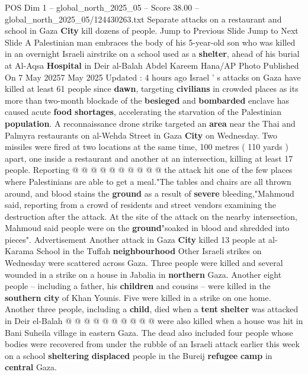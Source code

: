 \begin{textsample}{POS Dim 1 – global\_north\_2025\_05 – Score 38.00 – global\_north\_2025\_05/124430263.txt}  \label{ex:f1_pos_213}
Separate attacks on a restaurant and school in Gaza \textbf{City} kill dozens of people.
Jump to Previous Slide Jump to Next Slide A Palestinian man embraces the body of his 5-year-old son who was killed in an overnight Israeli airstrike on a school used as a \textbf{shelter}, ahead of his burial at Al-Aqsa \textbf{Hospital} in Deir al-Balah Abdel Kareem Hana/AP Photo Published On 7 May 20257 May 2025 Updated : 4 hours ago Israel ' s attacks on Gaza have killed at least 61 people since \textbf{dawn}, targeting \textbf{civilians} in crowded places as its more than two-month blockade of the \textbf{besieged} and \textbf{bombarded} enclave has caused acute \textbf{food} \textbf{shortages}, accelerating the starvation of the Palestinian \textbf{population}.
A reconnaissance drone strike targeted an \textbf{area} near the Thai and Palmyra restaurants on al-Wehda Street in Gaza \textbf{City} on Wednesday.
Two missiles were fired at two locations at the same time, 100 metres ( 110 yards ) apart, one inside a restaurant and another at an intersection, killing at least 17 people.
Reporting @ @ @ @ @ @ @ @ @ @ the attack hit one of the few places where Palestinians are able to get a meal."The tables and chairs are all thrown around, and blood stains the \textbf{ground} as a result of \textbf{severe} bleeding,"Mahmoud said, reporting from a crowd of residents and street vendors examining the destruction after the attack.
At the site of the attack on the nearby intersection, Mahmoud said people were on the \textbf{ground}"soaked in blood and shredded into pieces".
Advertisement Another attack in Gaza \textbf{City} killed 13 people at al-Karama School in the Tuffah \textbf{neighbourhood} Other Israeli strikes on Wednesday were scattered across Gaza.
Three people were killed and several wounded in a strike on a house in Jabalia in \textbf{northern} Gaza.
Another eight people -- including a father, his \textbf{children} and cousins -- were killed in the \textbf{southern} \textbf{city} of Khan Younis.
Five were killed in a strike on one home.
Another three people, including a \textbf{child}, died when a \textbf{tent} \textbf{shelter} was attacked in Deir el-Balah @ @ @ @ @ @ @ @ @ @ were also killed when a house was hit in Bani Suheila village in eastern Gaza.
The dead also included four people whose bodies were recovered from under the rubble of an Israeli attack earlier this week on a school \textbf{sheltering} \textbf{displaced} people in the Bureij \textbf{refugee} \textbf{camp} in \textbf{central} Gaza.

\end{textsample}
